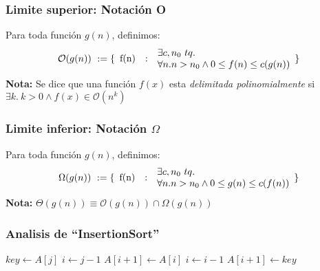 \documentclass{beamer}
\begin{document}
\begin{frame}
\frametitle{Limite superior: Notaci\'on O}
Para toda funci\'on $g(n)$, definimos:
\[
    \mathcal{O}(g(n))\ :=\{
        \begin{array}{l c l}
            \multirow{2}{*}{f(n)} & \multirow{2}{*}{:} & \exists c, n_0\ tq. \\
            & & \forall n. n>n_0 \wedge 0 \leq f(n)\leq c(g(n))
        \end{array}
    \}
\]
{\bf Nota: } Se dice que una funci\'on $f(x)$ esta \emph{delimitada polinomialmente}
si $\exists k.\ k>0\wedge f(x)\in\mathcal{O}(n^k)$
\end{frame}

\begin{frame}
\frametitle{Limite inferior: Notaci\'on $\Omega$}
Para toda funci\'on $g(n)$, definimos:
\[
    \Omega(g(n))\ :=\{
        \begin{array}{l c l}
            \multirow{2}{*}{f(n)} & \multirow{2}{*}{:} & \exists c, n_0\ tq. \\
            & & \forall n. n>n_0 \wedge 0 \leq g(n)\leq c(f(n))
        \end{array}
    \}
\]
{\bf Nota: } $\Theta(g(n))\equiv \mathcal{O}(g(n))\cap \Omega(g(n))$
\end{frame}

\begin{frame}
\frametitle{Analisis de ``InsertionSort''}

\begin{algorithmic}
    \State $key \gets A[j]$
    \State $i \gets j-1$
        \State $A[i+1] \gets A[i]$
        \State $i \gets i-1$
    \EndWhile
    \State $A[i+1] \gets key$
\EndFor
\EndFunction
\end{algorithmic}

\end{frame}
\end{document}
